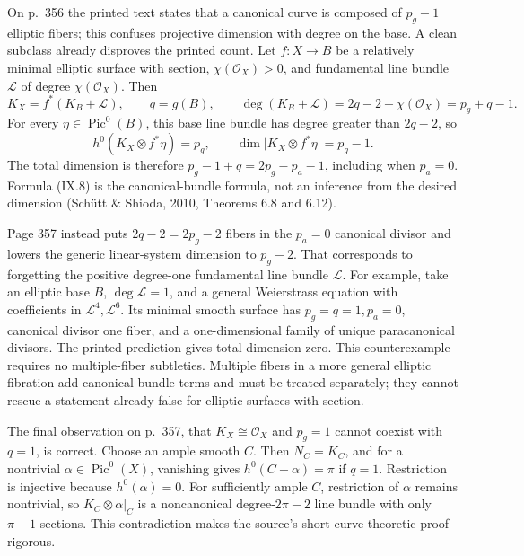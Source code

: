 On p.~356 the printed text states that a canonical curve is composed of \(p_g-1\) elliptic fibers; this confuses projective dimension with degree on the base. A clean subclass already disproves the printed count. Let \(f:X\to B\) be a relatively minimal elliptic surface with section, \(\chi(\mathcal O_X)>0\), and fundamental line bundle \(\mathcal L\) of degree \(\chi(\mathcal O_X)\). Then
\begin{equation*}\label{cp2-ix-eq8}
K_X=f^*(K_B+\mathcal L),\qquad
q=g(B),\qquad
\deg(K_B+\mathcal L)=2q-2+\chi(\mathcal O_X)=p_g+q-1.
\tag{IX.8}
\end{equation*}
For every \(\eta\in\operatorname{Pic}^0(B)\), this base line bundle has degree greater than \(2q-2\), so
\[
h^0(K_X\otimes f^*\eta)=p_g,\qquad
\dim\vert K_X\otimes f^*\eta\vert =p_g-1.
\]
The total dimension is therefore \(p_g-1+q=2p_g-p_a-1\), including when \(p_a=0\). Formula (IX.8) is the canonical-bundle formula, not an inference from the desired dimension (Schütt \& Shioda, 2010, Theorems 6.8 and 6.12).

Page 357 instead puts \(2q-2=2p_g-2\) fibers in the \(p_a=0\) canonical divisor and lowers the generic linear-system dimension to \(p_g-2\). That corresponds to forgetting the positive degree-one fundamental line bundle \(\mathcal L\). For example, take an elliptic base \(B\), \(\deg\mathcal L=1\), and a general Weierstrass equation with coefficients in \(\mathcal L^4,\mathcal L^6\). Its minimal smooth surface has \(p_g=q=1,p_a=0\), canonical divisor one fiber, and a one-dimensional family of unique paracanonical divisors. The printed prediction gives total dimension zero. This counterexample requires no multiple-fiber subtleties. Multiple fibers in a more general elliptic fibration add canonical-bundle terms and must be treated separately; they cannot rescue a statement already false for elliptic surfaces with section.

The final observation on p.~357, that \(K_X\cong\mathcal O_X\) and \(p_g=1\) cannot coexist with \(q=1\), is correct. Choose an ample smooth \(C\). Then \(N_C=K_C\), and for a nontrivial \(\alpha\in\operatorname{Pic}^0(X)\), vanishing gives \(h^0(C+\alpha)=\pi\) if \(q=1\). Restriction is injective because \(h^0(\alpha)=0\). For sufficiently ample \(C\), restriction of \(\alpha\) remains nontrivial, so \(K_C\otimes\alpha\vert _C\) is a noncanonical degree-\(2\pi-2\) line bundle with only \(\pi-1\) sections. This contradiction makes the source's short curve-theoretic proof rigorous.



